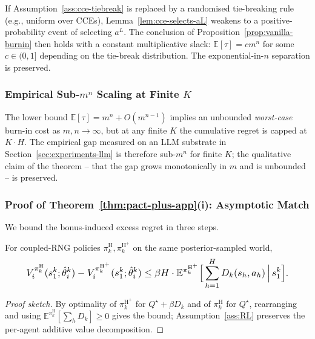 If Assumption~\ref{ass:cce-tiebreak} is replaced by a randomised tie-breaking rule (e.g., uniform over CCEs), Lemma~\ref{lem:cce-selects-aL} weakens to a positive-probability event of selecting $a^L$. The conclusion of Proposition~\ref{prop:vanilla-burnin} then holds with a constant multiplicative slack: $\mathbb{E}[\tau] = c m^n$ for some $c \in (0, 1]$ depending on the tie-break distribution. The exponential-in-$n$ separation is preserved.

\subsubsection{Empirical Sub-\texorpdfstring{$m^n$}{m\^n} Scaling at Finite \texorpdfstring{$K$}{K}}

The lower bound $\mathbb{E}[\tau] = m^n + O(m^{n-1})$ implies an unbounded \emph{worst-case} burn-in cost as $m, n \to \infty$, but at any finite $K$ the cumulative regret is capped at $K \cdot H$. The empirical gap measured on an LLM substrate in Section~\ref{sec:experiments-llm} is therefore sub-$m^n$ for finite $K$; the qualitative claim of the theorem -- that the gap grows monotonically in $m$ and is unbounded -- is preserved.

\subsubsection{Proof of Theorem~\ref{thm:pact-plus-app}(i): Asymptotic Match}
\label{app:pact-plus-asymptotic-proof}

We bound the bonus-induced excess regret in three steps.

\begin{lemma}
\label{lem:bonus-decomp}
For coupled-RNG policies $\pi_k^{\mathrm{H}}, \pi_k^{\mathrm{H}^+}$ on the same posterior-sampled world,
\begin{equation}\resizebox{0.9\linewidth}{!}{$\displaystyle V_i^{\pi_k^{\mathrm{H}}}(s_1^k; \hat\theta_i^k) - V_i^{\pi_k^{\mathrm{H}^+}}(s_1^k; \hat\theta_i^k) \le \beta H \cdot \mathbb{E}^{\pi_k^{\mathrm{H}^+}}\Big[\sum_{h=1}^H D_k(s_h,a_h)\,\Big|\,s_1^k\Big]. $}\end{equation}
\end{lemma}

\begin{proof}[Proof sketch]
By optimality of $\pi_k^{\mathrm{H}^+}$ for $Q^\star+\beta D_k$ and of $\pi_k^{\mathrm{H}}$ for $Q^\star$, rearranging and using $\mathbb{E}^{\pi_k^{\mathrm{H}}}[\sum_h D_k]\ge 0$ gives the bound; Assumption~\ref{ass:RL} preserves the per-agent additive value decomposition.
\end{proof}


